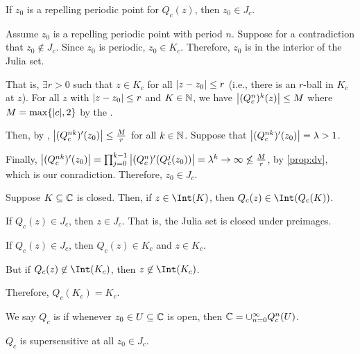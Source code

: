 \documentclass[class=pmath370,tikz,notes]{agony}
\begin{document}
\begin{theorem}
  If $z_0$ is a repelling periodic point for $Q_c(z)$, then $z_0 \in J_c$.
\end{theorem}
\begin{prf}
  Assume $z_0$ is a repelling periodic point with period $n$.
  Suppose for a contradiction that $z_0 \not\in J_c$.
  Since $z_0$ is periodic, $z_0 \in K_c$.
  Therefore, $z_0$ is in the interior of the Julia set.

  That is, $\exists r > 0$ such that $z \in K_c$ for all $\abs{z-z_0} \leq r$
  (i.e., there is an $r$-ball in $K_c$ at $z$).
  For all $z$ with $\abs{z-z_0} \leq r$ and $K \in \mathbb{N}$,
  we have $\abs{(Q_c^n)^k(z)} \leq M$ where $M = \max\{\abs{c},2\}$
  by the .

  Then, by , $\abs{(Q_c^{nk})'(z_0)} \leq \frac{M}{r}$
  for all $k \in \mathbb{N}$.
  Suppose that $\abs{(Q_c^{nk})'(z_0)} = \lambda > 1$.

  Finally, $\abs{(Q_c^{nk})'(z_0)} = \prod_{j=0}^{k-1} \abs{(Q_c^n)'(Q_c^j(z_0))} = \lambda^k \to \infty \not\leq \frac{M}{r}$,
  by \cref{prop:dv}, which is our conradiction.
  Therefore, $z_0 \in J_c$.
\end{prf}

\begin{fact}
  Suppose $K \subseteq \mathbb{C}$ is closed.
  Then, if $z \in \Int(K)$, then $Q_c(z) \in \Int(Q_c(K))$.
\end{fact}

\begin{prop}
  If $Q_c(z) \in J_c$, then $z \in J_c$.
  That is, the Julia set is closed under preimages.
\end{prop}
\begin{prf}
  If $Q_c(z) \in J_c$, then $Q_c(z) \in K_c$ and $z \in K_c$.

  But if $Q_c(z) \not\in \Int(K_c)$, then $z \not\in \Int(K_c)$.

  Therefore, $Q_c(K_c) = K_c$.
\end{prf}

\begin{defn}[supersensitivity]
  We say $Q_c$ is 
  if whenever $z_0 \in U \subseteq \mathbb{C}$ is open,
  then $\mathbb{C} = \cup_{n=0}^\infty Q_c^n(U)$.
\end{defn}

\begin{fact}
  $Q_c$ is supersensitive at all $z_0 \in J_c$.
\end{fact}
\end{document}
